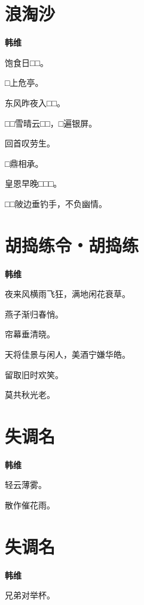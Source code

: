 \documentclass[12pt,a4paper]{ctexbook}
\begin{document}
\section{浪淘沙}
\textbf{韩维}\par\vspace{0.5em}
饱食日□□。\par
□上危亭。\par
东风昨夜入□□。\par
□□雪晴云□□，□遍银屏。\par
回首叹劳生。\par
□鼎相承。\par
皇恩早晚□□□。\par
□□陂边垂钓手，不负幽情。\par

\section{胡捣练令・胡捣练}
\textbf{韩维}\par\vspace{0.5em}
夜来风横雨飞狂，满地闲花衰草。\par
燕子渐归春悄。\par
帘幕垂清晓。\par
天将佳景与闲人，美酒宁嫌华皓。\par
留取旧时欢笑。\par
莫共秋光老。\par

\section{失调名}
\textbf{韩维}\par\vspace{0.5em}
轻云薄雾。\par
散作催花雨。\par

\section{失调名}
\textbf{韩维}\par\vspace{0.5em}
兄弟对举杯。\par
\end{document}
